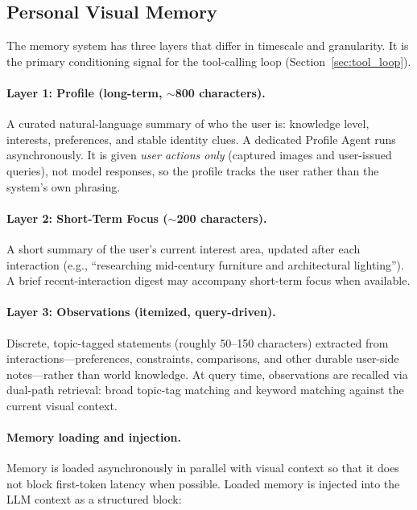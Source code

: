 \documentclass[11pt,a4paper]{article}
\begin{document}
\subsection{Personal Visual Memory}

The memory system has three layers that differ in timescale and granularity. It is the primary conditioning signal for the tool-calling loop (Section~\ref{sec:tool_loop}).

\paragraph{Layer 1: Profile (long-term, $\sim$800 characters).}
A curated natural-language summary of who the user is: knowledge level, interests, preferences, and stable identity clues. A dedicated Profile Agent runs asynchronously. It is given \emph{user actions only} (captured images and user-issued queries), not model responses, so the profile tracks the user rather than the system's own phrasing.

\paragraph{Layer 2: Short-Term Focus ($\sim$200 characters).}
A short summary of the user's current interest area, updated after each interaction (e.g., ``researching mid-century furniture and architectural lighting''). A brief recent-interaction digest may accompany short-term focus when available.

\paragraph{Layer 3: Observations (itemized, query-driven).}
Discrete, topic-tagged statements (roughly 50--150 characters) extracted from interactions---preferences, constraints, comparisons, and other durable user-side notes---rather than world knowledge. At query time, observations are recalled via dual-path retrieval: broad topic-tag matching and keyword matching against the current visual context.

\paragraph{Memory loading and injection.}
Memory is loaded asynchronously in parallel with visual context so that it does not block first-token latency when possible. Loaded memory is injected into the LLM context as a structured block:
\end{document}
